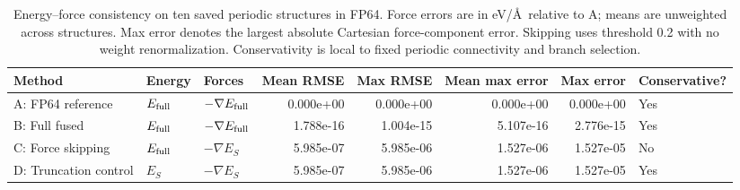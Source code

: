 \begin{table}[t]
\centering
\scriptsize
\setlength{\tabcolsep}{3pt}
\caption{Energy--force consistency on ten saved periodic structures in FP64.
Force errors are in eV/\AA\ relative to A; means are unweighted across structures.
Max error denotes the largest absolute Cartesian force-component error.
Skipping uses threshold 0.2 with no weight renormalization.
Conservativity is local to fixed periodic connectivity and branch selection.}
\label{tab:force-consistency}
\begin{tabular}{lllrrrrl}
\hline
Method & Energy & Forces & Mean RMSE & Max RMSE & Mean max error & Max error & Conservative? \\
\hline
A: FP64 reference & $E_{\rm full}$ & $-\nabla E_{\rm full}$ & 0.000e+00 & 0.000e+00 & 0.000e+00 & 0.000e+00 & Yes \\
B: Full fused & $E_{\rm full}$ & $-\nabla E_{\rm full}$ & 1.788e-16 & 1.004e-15 & 5.107e-16 & 2.776e-15 & Yes \\
C: Force skipping & $E_{\rm full}$ & $-\nabla E_S$ & 5.985e-07 & 5.985e-06 & 1.527e-06 & 1.527e-05 & No \\
D: Truncation control & $E_S$ & $-\nabla E_S$ & 5.985e-07 & 5.985e-06 & 1.527e-06 & 1.527e-05 & Yes \\
\hline
\end{tabular}
\end{table}
